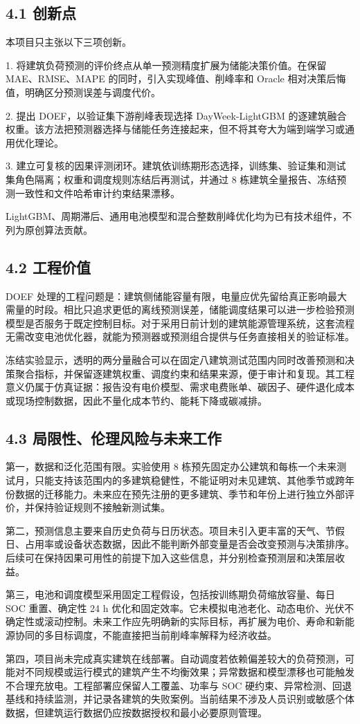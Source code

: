 \documentclass[12pt,a4paper]{article}
\begin{document}
\subsection{4.1 创新点}
本项目只主张以下三项创新。\par
1. 将建筑负荷预测的评价终点从单一预测精度扩展为储能决策价值。在保留 MAE、RMSE、MAPE 的同时，引入实现峰值、削峰率和 Oracle 相对决策后悔值，明确区分预测误差与调度代价。\par
2. 提出 DOEF，以验证集下游削峰表现选择 DayWeek-LightGBM 的逐建筑融合权重。该方法把预测器选择与储能任务连接起来，但不将其夸大为端到端学习或通用优化理论。\par
3. 建立可复核的因果评测闭环。建筑依训练期形态选择，训练集、验证集和测试集角色隔离；权重和调度规则冻结后再测试，并通过 8 栋建筑全量报告、冻结预测一致性和文件哈希审计约束结果漂移。\par
LightGBM、周期滞后、通用电池模型和混合整数削峰优化均为已有技术组件，不列为原创算法贡献。\par
\subsection{4.2 工程价值}
DOEF 处理的工程问题是：建筑侧储能容量有限，电量应优先留给真正影响最大需量的时段。相比只追求更低的离线预测误差，储能调度结果可以进一步检验预测模型是否服务于既定控制目标。对于采用日前计划的建筑能源管理系统，这套流程无需改变电池优化器，就能为预测器或预测组合提供与任务直接相关的验证标准。\par
冻结实验显示，透明的两分量融合可以在固定八建筑测试范围内同时改善预测和决策聚合指标，并保留逐建筑权重、调度约束和结果来源，便于审计和复现。其工程意义仍属于仿真证据：报告没有电价模型、需求电费账单、碳因子、硬件退化成本或现场控制数据，因此不量化成本节约、能耗下降或碳减排。\par
\subsection{4.3 局限性、伦理风险与未来工作}
第一，数据和泛化范围有限。实验使用 8 栋预先固定办公建筑和每栋一个未来测试月，只能支持该范围内的多建筑稳健性，不能证明对未见建筑、其他季节或跨年份数据的迁移能力。未来应在预先注册的更多建筑、季节和年份上进行独立外部评价，并保持验证规则不接触新测试集。\par
第二，预测信息主要来自历史负荷与日历状态。项目未引入更丰富的天气、节假日、占用率或设备状态数据，因此不能判断外部变量是否会改变预测与决策排序。后续可在保持因果可用性的前提下加入这些信息，并分别检查预测层和决策层收益。\par
第三，电池和调度模型采用固定工程假设，包括按训练期负荷缩放容量、每日 SOC 重置、确定性 24 h 优化和固定效率。它未模拟电池老化、动态电价、光伏不确定性或滚动控制。未来工作应先明确新的实际目标，再扩展为电价、寿命和新能源协同的多目标调度，不能直接把当前削峰率解释为经济收益。\par
第四，项目尚未完成真实建筑在线部署。自动调度若依赖偏差较大的负荷预测，可能对不同规模或运行模式的建筑产生不均衡效果；异常数据和模型漂移也可能触发不合理充放电。工程部署应保留人工覆盖、功率与 SOC 硬约束、异常检测、回退基线和持续监测，并记录各建筑的失败案例。当前结果不涉及人员识别或敏感个体数据，但建筑运行数据仍应按数据授权和最小必要原则管理。\par
\end{document}
